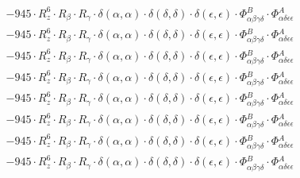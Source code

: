 \documentclass{article}
\begin{document}
\begin{subequations}
\begin{gather}
\begin{array}{c}
 \\[0.2em] 		 - 945 \cdot R_{z}^{6} \cdot R_{\beta{}} \cdot R_{\gamma{}} \cdot \delta{}\left(\alpha{}, \alpha{}\right) \cdot \delta{}\left(\delta{}, \delta{}\right) \cdot \delta{}\left(\epsilon{}, \epsilon{}\right) \cdot \Phi{}^{B}_{\alpha{}\beta{}\gamma{}\delta{}} \cdot \Phi{}^{A}_{\alpha{}\delta{}\epsilon{}\epsilon{}} 
 \\[0.2em] 		 - 945 \cdot R_{z}^{6} \cdot R_{\beta{}} \cdot R_{\gamma{}} \cdot \delta{}\left(\alpha{}, \alpha{}\right) \cdot \delta{}\left(\delta{}, \delta{}\right) \cdot \delta{}\left(\epsilon{}, \epsilon{}\right) \cdot \Phi{}^{B}_{\alpha{}\beta{}\gamma{}\delta{}} \cdot \Phi{}^{A}_{\alpha{}\delta{}\epsilon{}\epsilon{}} 
 \\[0.2em] 		 - 945 \cdot R_{z}^{6} \cdot R_{\beta{}} \cdot R_{\gamma{}} \cdot \delta{}\left(\alpha{}, \alpha{}\right) \cdot \delta{}\left(\delta{}, \delta{}\right) \cdot \delta{}\left(\epsilon{}, \epsilon{}\right) \cdot \Phi{}^{B}_{\alpha{}\beta{}\gamma{}\delta{}} \cdot \Phi{}^{A}_{\alpha{}\delta{}\epsilon{}\epsilon{}} 
 \\[0.2em] 		 - 945 \cdot R_{z}^{6} \cdot R_{\beta{}} \cdot R_{\gamma{}} \cdot \delta{}\left(\alpha{}, \alpha{}\right) \cdot \delta{}\left(\delta{}, \delta{}\right) \cdot \delta{}\left(\epsilon{}, \epsilon{}\right) \cdot \Phi{}^{B}_{\alpha{}\beta{}\gamma{}\delta{}} \cdot \Phi{}^{A}_{\alpha{}\delta{}\epsilon{}\epsilon{}} 
 \\[0.2em] 		 - 945 \cdot R_{z}^{6} \cdot R_{\beta{}} \cdot R_{\gamma{}} \cdot \delta{}\left(\alpha{}, \alpha{}\right) \cdot \delta{}\left(\delta{}, \delta{}\right) \cdot \delta{}\left(\epsilon{}, \epsilon{}\right) \cdot \Phi{}^{B}_{\alpha{}\beta{}\gamma{}\delta{}} \cdot \Phi{}^{A}_{\alpha{}\delta{}\epsilon{}\epsilon{}} 
 \\[0.2em] 		 - 945 \cdot R_{z}^{6} \cdot R_{\beta{}} \cdot R_{\gamma{}} \cdot \delta{}\left(\alpha{}, \alpha{}\right) \cdot \delta{}\left(\delta{}, \delta{}\right) \cdot \delta{}\left(\epsilon{}, \epsilon{}\right) \cdot \Phi{}^{B}_{\alpha{}\beta{}\gamma{}\delta{}} \cdot \Phi{}^{A}_{\alpha{}\delta{}\epsilon{}\epsilon{}} 
 \\[0.2em] 		 - 945 \cdot R_{z}^{6} \cdot R_{\beta{}} \cdot R_{\gamma{}} \cdot \delta{}\left(\alpha{}, \alpha{}\right) \cdot \delta{}\left(\delta{}, \delta{}\right) \cdot \delta{}\left(\epsilon{}, \epsilon{}\right) \cdot \Phi{}^{B}_{\alpha{}\beta{}\gamma{}\delta{}} \cdot \Phi{}^{A}_{\alpha{}\delta{}\epsilon{}\epsilon{}} 
 \\[0.2em] 		 - 945 \cdot R_{z}^{6} \cdot R_{\beta{}} \cdot R_{\gamma{}} \cdot \delta{}\left(\alpha{}, \alpha{}\right) \cdot \delta{}\left(\delta{}, \delta{}\right) \cdot \delta{}\left(\epsilon{}, \epsilon{}\right) \cdot \Phi{}^{B}_{\alpha{}\beta{}\gamma{}\delta{}} \cdot \Phi{}^{A}_{\alpha{}\delta{}\epsilon{}\epsilon{}} 

\end{array}
\end{gather}
\end{subequations}
\end{document}
